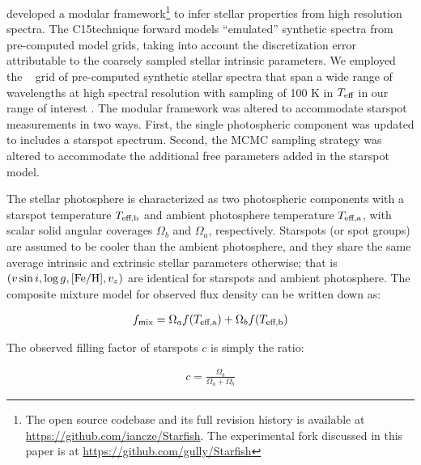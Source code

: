 \documentclass[twocolumn]{emulateapj}%
\newcommand{\iancze}{{\sc C15}}
\begin{document}
\citet[hereafter \iancze]{czekala15} developed a modular framework\footnote{The open source codebase and its full revision history is available at \url{https://github.com/iancze/Starfish}.  The experimental fork discussed in this paper is at \url{https://github.com/gully/Starfish}} to infer stellar properties from high resolution spectra.  The \iancze technique forward models ``emulated'' synthetic spectra from pre-computed model grids, taking into account the discretization error attributable to the coarsely sampled stellar intrinsic parameters.  We employed the \PHOENIX~ grid of pre-computed synthetic stellar spectra that span a wide range of wavelengths at high spectral resolution with sampling of 100 K in $T_\textrm{eff}$ in our range of interest \citep{husser13}.  The modular framework was altered to accommodate starspot measurements in two ways. First, the single photospheric component was updated to includes a starspot spectrum. Second, the MCMC sampling strategy was altered to accommodate the additional free parameters added in the starspot model.

The stellar photosphere is characterized as two photospheric components with a starspot temperature $T_\textrm{eff,b}$ and ambient photosphere temperature $T_\textrm{eff,a}$, with scalar solid angular coverages $\Omega_b$ and $\Omega_a$, respectively.    Starspots (or spot groups) are assumed to be cooler than the ambient photosphere, and they share the same average intrinsic and extrinsic stellar parameters otherwise; that is $(v \sin i, \log g, [{\rm Fe}/{\rm H}], v_z)$ are identical for starspots and ambient photosphere.  The composite mixture model for observed flux density can be written down as:

\begin{eqnarray} \label{eqn:mix_M}
f_{\mathrm{mix}} = \Omega_a f(T_\textrm{eff,a})  + \Omega_b f(T_\textrm{eff,b})
\end{eqnarray}

The observed filling factor of starspots $c$ is simply the ratio:

\begin{eqnarray} \label{eqn:fill_factor}
c = \frac{\Omega_b}{\Omega_a + \Omega_b}
\end{eqnarray}
\end{document}
